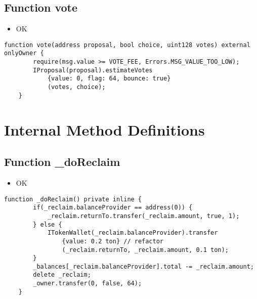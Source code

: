 \subsection{Function vote}

\begin{itemize}
\item OK
\end{itemize}

\begin{lstlisting}[firstnumber=53]
    function vote(address proposal, bool choice, uint128 votes) external onlyOwner {
        require(msg.value >= VOTE_FEE, Errors.MSG_VALUE_TOO_LOW);
        IProposal(proposal).estimateVotes
            {value: 0, flag: 64, bounce: true}
            (votes, choice);
    }
\end{lstlisting}

\section{Internal Method Definitions}


\subsection{Function \_{}doReclaim}

\begin{itemize}
\item OK
\end{itemize}

\begin{lstlisting}[firstnumber=191]
    function _doReclaim() private inline {
        if(_reclaim.balanceProvider == address(0)) {
            _reclaim.returnTo.transfer(_reclaim.amount, true, 1);
        } else {
            ITokenWallet(_reclaim.balanceProvider).transfer
                {value: 0.2 ton} // refactor
                (_reclaim.returnTo, _reclaim.amount, 0.1 ton);
        }
        _balances[_reclaim.balanceProvider].total -= _reclaim.amount;
        delete _reclaim;
        _owner.transfer(0, false, 64);
    }
\end{lstlisting}
